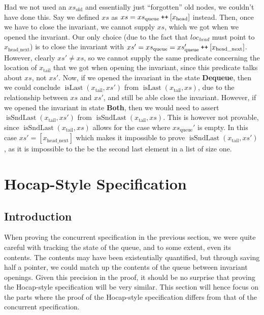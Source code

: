 \documentclass[a4paper, 10pt]{report}
\theoremstyle{definition}
\newcommand{\xsc}{xs}
\newcommand{\xsqueue}{xs_{\mathrm{queue}}}
\newcommand{\xsold}{xs_{\mathrm{old}}}
\newcommand{\isLast}{\operatorname{isLast}}
\newcommand{\isSndLast}{\operatorname{isSndLast}}
\newcommand{\node}{x}
\newcommand{\nodeN}[1]{\node_{\mathrm{#1}}}
\newcommand{\nodehead}{\nodeN{head}}
\newcommand{\nodetail}{\nodeN{tail}}
\newcommand{\nodeheadnext}{\nodeN{head\_next}}
\newcommand{\DequeueState}{\textbf{Dequeue}\xspace}
\newcommand{\BothState}{\textbf{Both}\xspace}
\newcommand\catenate{\mathbin{\text{\ttfamily\upshape ++}}}
\begin{document}
Had we not used an $\xsold$ and essentially just ``forgotten'' old nodes, we couldn't have done this. Say we defined $\xsc$ as $\xsc = \xsqueue \catenate [\nodehead]$ instead. Then, once we have to close the invariant, we cannot supply $\xsc$, which we got when we opened the invariant. Our only choice (due to the fact that $loc_{head}$ must point to $\nodeheadnext$) is to close the invariant with $\xsc' = \xsqueue = \xsqueue' \catenate [\nodeheadnext]$. However, clearly $\xsc' \neq \xsc$, so we cannot supply the same predicate concerning the location of $\nodetail$ that we got when opening the invariant, since this predicate talks about $\xsc$, not $\xsc'$. Now, if we opened the invariant in the state \DequeueState, then we could conclude $\isLast(\nodetail, \xsc')$ from $\isLast(\nodetail, \xsc)$, due to the relationship between $\xsc$ and $\xsc'$, and still be able close the invariant. However, if we opened the invariant in state \BothState, then we would need to assert $\isSndLast(\nodetail, \xsc')$ from $\isSndLast(\nodetail, \xsc)$. This is however not provable, since $\isSndLast(\nodetail, \xsc)$ allows for the case where $\xsqueue'$ is empty. In this case $\xsc' = [\nodeheadnext]$ which makes it impossible to prove $\isSndLast(\nodetail, \xsc')$, as it is impossible to the be the second last element in a list of size one.

\section{Hocap-Style Specification}
\label{TLMSQSPECS:section:hocap}

\subsection{Introduction}
When proving the concurrent specification in the previous section, we were quite careful with tracking the state of the queue, and to some extent, even its contents. The contents may have been existentially quantified, but through saving half a pointer, we could match up the contents of the queue between invariant openings. Given this precision in the proof, it should be no surprise that proving the Hocap-style specification will be very similar. This section will hence focus on the parts where the proof of the Hocap-style specification differs from that of the concurrent specification.
\end{document}
